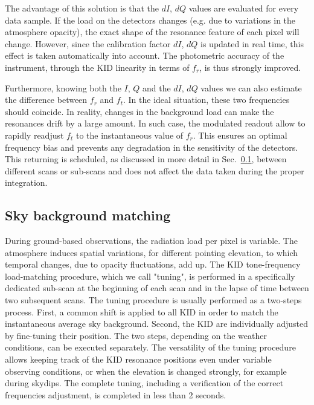 \documentclass[]{aa} %
\begin{document}
The advantage of this solution is that the $dI$, $dQ$ values are evaluated for every data sample. If the load on the detectors changes (e.g. due to variations in the atmosphere opacity), the exact shape of the resonance feature of each pixel will change. However, since the calibration factor $dI$, $dQ$ is updated in real time, this effect is taken automatically into account. The photometric accuracy of the instrument, through the KID linearity in terms of $f_r$, is thus strongly improved.

Furthermore, knowing both the $I$, $Q$ and the $dI$, $dQ$ values we can also estimate the difference between $f_r$ and $f_t$. In the ideal situation, these two frequencies should coincide. In reality, changes in the background load can make the resonances drift by a large amount. In such case, the modulated readout allow to rapidly readjust $f_t$ to the instantaneous value of $f_r$. This ensures an optimal frequency bias and prevents any degradation in the sensitivity of the detectors. This returning is scheduled, as discussed in more detail in Sec.~\ref{Sky background matching}, between different scans or sub-scans and does not affect the data taken during the proper integration.

\subsection{Sky background matching}
\label{Sky background matching}

During ground-based observations, the radiation load per pixel is variable. The atmosphere induces spatial variations, for different pointing elevation, to which temporal changes, due to opacity fluctuations, add up. The KID tone-frequency load-matching procedure, which we call "tuning", is performed in a specifically dedicated sub-scan at the beginning of each scan and in the lapse of time between two subsequent scans. The tuning procedure is usually performed as a two-steps process. First, a common shift is applied to all KID in order to match the instantaneous average sky background. Second, the KID are individually adjusted by fine-tuning their position. The two steps, depending on the weather conditions, can be executed separately. The versatility of the tuning procedure allows keeping track of the KID resonance positions even under variable observing conditions, or when the elevation is changed strongly, for example during skydips. The complete tuning, including a verification of the correct frequencies adjustment, is completed in less than 2 seconds. 
\end{document}
